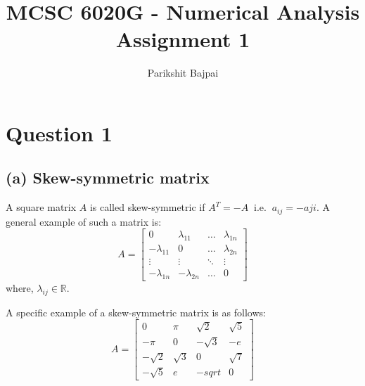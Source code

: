 \documentclass[11pt, oneside]{article}
\title{MCSC 6020G - Numerical Analysis \\
        \Large Assignment 1}
\author{Parikshit Bajpai}
\date{}
\begin{document}
\maketitle

\section*{Question 1}
\subsection*{(a) Skew-symmetric matrix}
  A square matrix $A$ is called skew-symmetric if $A^T = -A \;\; \text{i.e.} \;\; a_{ij}=-a{ji}$. A general example of such a matrix is:
  \begin{equation*}
      A=
      \begin{bmatrix}
        0              & \lambda_{11}  & \dots   & \lambda_{1n} \\
        -\lambda_{11}  & 0             & \dots   & \lambda_{2n} \\
        \vdots         & \vdots        & \ddots  & \vdots \\
        -\lambda_{1n}  & -\lambda_{2n} & \dots   & 0
      \end{bmatrix}
  \end{equation*}
  where, $\lambda_{ij} \in \mathbb{R}$.

  A specific example of a skew-symmetric matrix is as follows:
  \begin{equation*}
    A=
    \begin{bmatrix}
      0              & \pi        & \sqrt{2}     & \sqrt{5}\\
      -\pi           & 0          & -\sqrt{3}    & -e\\
      -\sqrt{2}      & \sqrt{3}   & 0            & \sqrt{7}\\
      -\sqrt{5}      & e          & -sqrt             & 0
    \end{bmatrix}
  \end{equation*}
\end{document}
